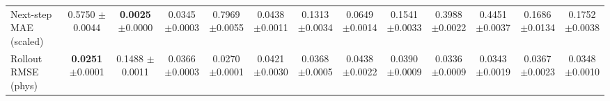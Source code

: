 \begin{table}[t]
{\begin{tabular}{lcccccccccccc}
Next-step MAE (scaled) & \makecell{0.5750\\[-2pt]{\scriptsize$\pm$0.0044}} & \makecell{\textbf{0.0025}\\[-2pt]{\scriptsize$\pm$0.0000}} & \makecell{0.0345\\[-2pt]{\scriptsize$\pm$0.0003}} & \makecell{0.7969\\[-2pt]{\scriptsize$\pm$0.0055}} & \makecell{0.0438\\[-2pt]{\scriptsize$\pm$0.0011}} & \makecell{0.1313\\[-2pt]{\scriptsize$\pm$0.0034}} & \makecell{0.0649\\[-2pt]{\scriptsize$\pm$0.0014}} & \makecell{0.1541\\[-2pt]{\scriptsize$\pm$0.0033}} & \makecell{0.3988\\[-2pt]{\scriptsize$\pm$0.0022}} & \makecell{0.4451\\[-2pt]{\scriptsize$\pm$0.0037}} & \makecell{0.1686\\[-2pt]{\scriptsize$\pm$0.0134}} & \makecell{0.1752\\[-2pt]{\scriptsize$\pm$0.0038}} \\
Rollout RMSE (phys) & \makecell{\textbf{0.0251}\\[-2pt]{\scriptsize$\pm$0.0001}} & \makecell{0.1488\\[-2pt]{\scriptsize$\pm$0.0011}} & \makecell{0.0366\\[-2pt]{\scriptsize$\pm$0.0003}} & \makecell{0.0270\\[-2pt]{\scriptsize$\pm$0.0001}} & \makecell{0.0421\\[-2pt]{\scriptsize$\pm$0.0030}} & \makecell{0.0368\\[-2pt]{\scriptsize$\pm$0.0005}} & \makecell{0.0438\\[-2pt]{\scriptsize$\pm$0.0022}} & \makecell{0.0390\\[-2pt]{\scriptsize$\pm$0.0009}} & \makecell{0.0336\\[-2pt]{\scriptsize$\pm$0.0009}} & \makecell{0.0343\\[-2pt]{\scriptsize$\pm$0.0019}} & \makecell{0.0367\\[-2pt]{\scriptsize$\pm$0.0023}} & \makecell{0.0348\\[-2pt]{\scriptsize$\pm$0.0010}} \\

\end{tabular}}
\end{table}
